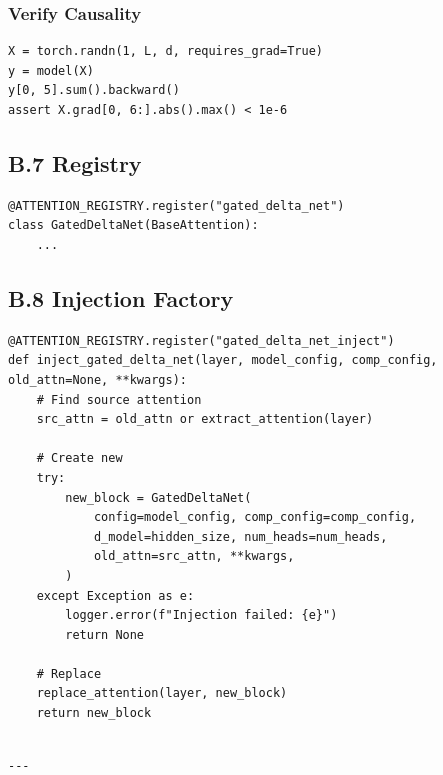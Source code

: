 \subsubsection{Verify Causality}

\begin{lstlisting}
X = torch.randn(1, L, d, requires_grad=True)
y = model(X)
y[0, 5].sum().backward()
assert X.grad[0, 6:].abs().max() < 1e-6
\end{lstlisting}

\subsection{B.7 Registry}

\begin{lstlisting}
@ATTENTION_REGISTRY.register("gated_delta_net")
class GatedDeltaNet(BaseAttention):
    ...
\end{lstlisting}

\subsection{B.8 Injection Factory}

\begin{lstlisting}
@ATTENTION_REGISTRY.register("gated_delta_net_inject")
def inject_gated_delta_net(layer, model_config, comp_config, old_attn=None, **kwargs):
    # Find source attention
    src_attn = old_attn or extract_attention(layer)
    
    # Create new
    try:
        new_block = GatedDeltaNet(
            config=model_config, comp_config=comp_config,
            d_model=hidden_size, num_heads=num_heads,
            old_attn=src_attn, **kwargs,
        )
    except Exception as e:
        logger.error(f"Injection failed: {e}")
        return None
    
    # Replace
    replace_attention(layer, new_block)
    return new_block
\end{lstlisting}
\begin{lstlisting}

---
\end{lstlisting}